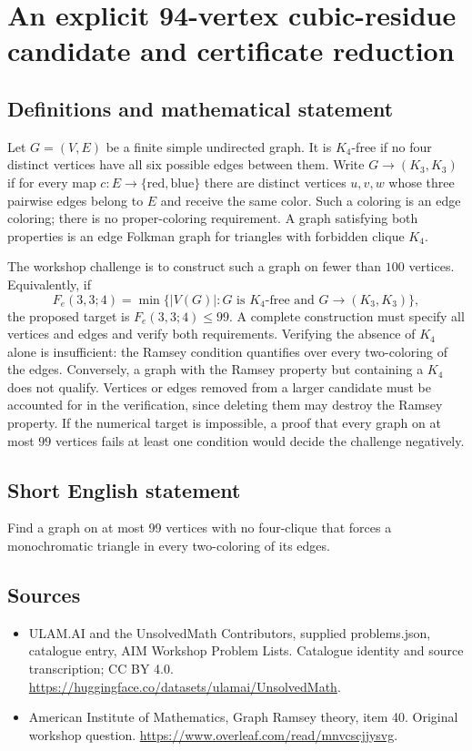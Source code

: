 \documentclass[11pt,a4paper]{article}
\begin{document}
\section*{An explicit 94-vertex cubic-residue candidate and certificate reduction}\label{statement}

\subsection{Definitions and mathematical statement}
Let $G=(V,E)$ be a finite simple undirected graph. It is $K_4$-free
if no four distinct vertices have all six possible edges between them.
Write $G\to(K_3,K_3)$ if for every map $c:E\to\{\mathrm{red},\mathrm{blue}\}$
there are distinct vertices $u,v,w$ whose three pairwise edges belong
to $E$ and receive the same color. Such a coloring is an edge coloring;
there is no proper-coloring requirement.
A graph satisfying both properties is an edge Folkman graph for
triangles with forbidden clique $K_4$.

The workshop challenge is to construct such a graph on fewer than
$100$ vertices. Equivalently, if
\[
 F_e(3,3;4)=\min\{|V(G)|:G\text{ is }K_4\text{-free and }
                                     G\to(K_3,K_3)\},
\]
the proposed target is $F_e(3,3;4)\le99$.
A complete construction must specify all vertices and edges and verify
both requirements. Verifying the absence of $K_4$ alone is insufficient:
the Ramsey condition quantifies over every two-coloring of the edges.
Conversely, a graph with the Ramsey property but containing a $K_4$
does not qualify. Vertices or edges removed from a larger candidate
must be accounted for in the verification, since deleting them may
destroy the Ramsey property. If the numerical target is impossible,
a proof that every graph on at most $99$ vertices fails at least one
condition would decide the challenge negatively.
\subsection{Short English statement}
Find a graph on at most 99 vertices with no four-clique that forces a monochromatic triangle in every two-coloring of its edges.
\subsection{Sources}
\begin{itemize}
\item[S1] ULAM.AI and the UnsolvedMath Contributors, supplied problems.json, catalogue entry, AIM Workshop Problem Lists. Catalogue identity and source transcription; CC BY 4.0.
\url{https://huggingface.co/datasets/ulamai/UnsolvedMath}.
\item[S2] American Institute of Mathematics, Graph Ramsey theory, item 40. Original workshop question.
\url{https://www.overleaf.com/read/mnvcscjjysvg}.
\end{itemize}
\end{document}
